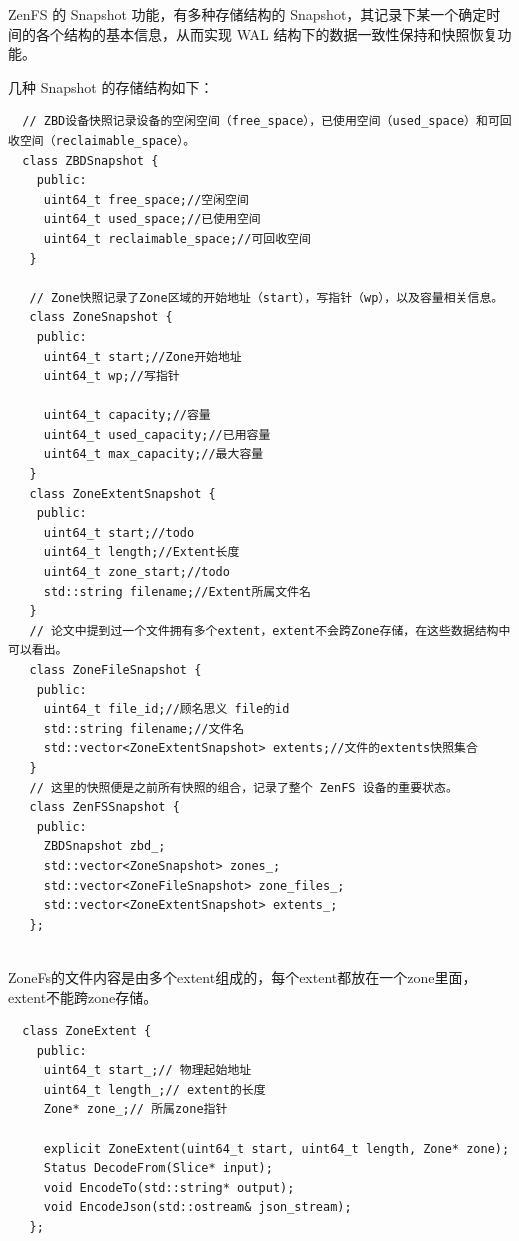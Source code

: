 ZenFS 的 Snapshot 功能，有多种存储结构的 Snapshot，其记录下某一个确定时间的各个结构的基本信息，从而实现 WAL 结构下的数据一致性保持和快照恢复功能。

几种 Snapshot 的存储结构如下：

\begin{lstlisting}
  // ZBD设备快照记录设备的空闲空间（free_space），已使用空间（used_space）和可回收空间（reclaimable_space）。
  class ZBDSnapshot {
    public:
     uint64_t free_space;//空闲空间
     uint64_t used_space;//已使用空间
     uint64_t reclaimable_space;//可回收空间
   }

   // Zone快照记录了Zone区域的开始地址（start），写指针（wp），以及容量相关信息。
   class ZoneSnapshot {
    public:
     uint64_t start;//Zone开始地址
     uint64_t wp;//写指针
   
     uint64_t capacity;//容量
     uint64_t used_capacity;//已用容量
     uint64_t max_capacity;//最大容量
   }
   class ZoneExtentSnapshot {
    public:
     uint64_t start;//todo
     uint64_t length;//Extent长度
     uint64_t zone_start;//todo
     std::string filename;//Extent所属文件名
   }
   // 论文中提到过一个文件拥有多个extent，extent不会跨Zone存储，在这些数据结构中可以看出。
   class ZoneFileSnapshot {
    public:
     uint64_t file_id;//顾名思义 file的id
     std::string filename;//文件名
     std::vector<ZoneExtentSnapshot> extents;//文件的extents快照集合
   }
   // 这里的快照便是之前所有快照的组合，记录了整个 ZenFS 设备的重要状态。
   class ZenFSSnapshot {
    public:
     ZBDSnapshot zbd_;
     std::vector<ZoneSnapshot> zones_;
     std::vector<ZoneFileSnapshot> zone_files_;
     std::vector<ZoneExtentSnapshot> extents_;
   };
   
\end{lstlisting}


ZoneFs的文件内容是由多个extent组成的，每个extent都放在一个zone里面，extent不能跨zone存储。

\begin{lstlisting}
  class ZoneExtent {
    public:
     uint64_t start_;// 物理起始地址
     uint64_t length_;// extent的长度
     Zone* zone_;// 所属zone指针
   
     explicit ZoneExtent(uint64_t start, uint64_t length, Zone* zone);
     Status DecodeFrom(Slice* input);
     void EncodeTo(std::string* output);
     void EncodeJson(std::ostream& json_stream);
   };   
\end{lstlisting}


